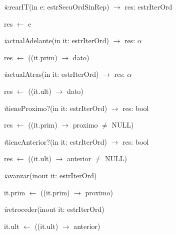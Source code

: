 \textit{i}crearIT(in e: estrSecuOrdSinRep) $\longrightarrow$ res: estrIterOrd\\
\begin{algorithm}[H]
\BlankLine
res $\leftarrow$ e
\end{algorithm}

\textit{i}actualAdelante(in it: estrIterOrd) $\longrightarrow$ res: $\alpha$\\
\begin{algorithm}[H]
\BlankLine
res $\leftarrow$ ((it.prim) $\rightarrow$ dato)
\end{algorithm}

\textit{i}actualAtras(in it: estrIterOrd) $\longrightarrow$ res: $\alpha$\\
\begin{algorithm}[H]
\BlankLine
res $\leftarrow$ ((it.ult) $\rightarrow$ dato)
\end{algorithm}

\textit{i}tieneProximo?(in it: estrIterOrd) $\longrightarrow$ res: bool\\
\begin{algorithm}[H]
\BlankLine
res $\leftarrow$ ((it.prim) $\rightarrow$ proximo $\neq$ NULL)
\end{algorithm}

\textit{i}tieneAnterior?(in it: estrIterOrd) $\longrightarrow$ res: bool\\
\begin{algorithm}[H]
\BlankLine
res $\leftarrow$ ((it.ult) $\rightarrow$ anterior $\neq$ NULL)
\end{algorithm}

\textit{i}avanzar(inout it: estrIterOrd)\\
\begin{algorithm}[H]
\BlankLine
it.prim $\leftarrow$ ((it.prim) $\rightarrow$ proximo)
\end{algorithm}

\textit{i}retroceder(inout it: estrIterOrd)\\
\begin{algorithm}[H]
\BlankLine
it.ult $\leftarrow$ ((it.ult) $\rightarrow$ anterior)
\end{algorithm}
